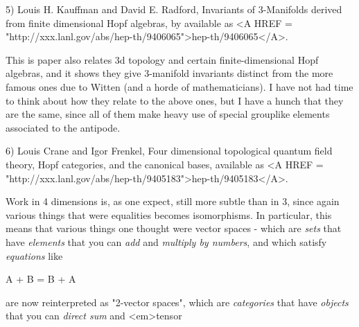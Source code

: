 5) Louis H. Kauffman and David E. Radford, 
Invariants of 3-Manifolds derived from finite dimensional Hopf algebras, by
available as
<A HREF = "http://xxx.lanl.gov/abs/hep-th/9406065">hep-th/9406065</A>. 

This is paper also relates 3d topology and certain finite-dimensional
Hopf algebras, and it shows they give 3-manifold invariants distinct
from the more famous ones due to Witten (and a horde of mathematicians).
I have not had time to think about how they relate to the above ones,
but I have a hunch that they are the same, since all of them make heavy
use of special grouplike elements associated to the antipode.  

6) Louis Crane and Igor Frenkel, 
Four dimensional topological quantum field theory, Hopf categories,
and the canonical bases, 
available as
<A HREF = "http://xxx.lanl.gov/abs/hep-th/9405183">hep-th/9405183</A>.   

Work in 4 dimensions is, as one expect, still more subtle than in 3,
since again various things that were equalities becomes isomorphisms.
In particular, this means that various things one thought were vector
spaces - which are \emph{sets} 
that have \emph{elements} that you can \emph{add} and
\emph{multiply by numbers}, and which satisfy \emph{equations} 
like 

A + B = B + A

are now reinterpreted as "2-vector spaces", which are
\emph{categories} that have \emph{objects} 
that you can \emph{direct sum} and <em>tensor


